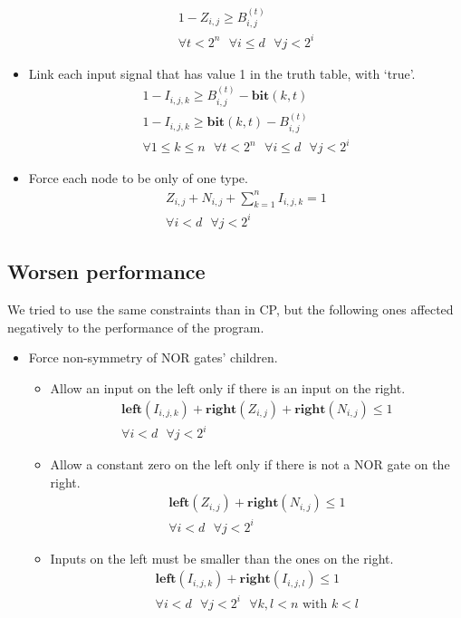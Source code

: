 \documentclass[letterpaper,10pt]{article}
\begin{document}
\begin{itemize}
\begin{align*}
        1 - Z_{i,j} \geq B_{i,j}^{(t)} \\
        \forall t < 2^n\text{ }\forall i \leq d\text{ }\forall j < 2^i
    \end{align*}
    \item Link each input signal that has value 1 in the truth table, with `true'.
    \begin{align*}
        1 - I_{i,j,k} \geq B_{i,j}^{(t)} - \mathbf{bit}(k,t) \\
        1 - I_{i,j,k} \geq \mathbf{bit}(k,t) - B_{i,j}^{(t)} \\
        \forall 1 \leq k \leq n\text{ }\forall t  < 2^n\text{ }\forall i \leq d\text{ }\forall j < 2^i
    \end{align*}
    \item Force each node to be only of one type.
    \begin{align*}
        Z_{i,j} + N_{i,j} + \sum_{k = 1}^n {I_{i,j,k}} = 1\\
        \forall i < d\text{ }\forall j < 2^i
    \end{align*}
\end{itemize}

\subsection{Worsen performance}
We tried to use the same constraints than in CP, but the following ones affected negatively to the performance of the program.
\begin{itemize}
\item Force non-symmetry of NOR gates' children.
\begin{itemize}
    \item Allow an input on the left only if there is an input on the right.
        \begin{align*}
            \mathbf{left}(I_{i,j,k}) + \mathbf{right}(Z_{i,j}) + \mathbf{right}(N_{i,j}) \leq 1 \\
            \forall i < d\text{ }\forall j < 2^i
        \end{align*}
    \item Allow a constant zero on the left only if there is not a NOR gate on the right.
        \begin{align*}
            \mathbf{left}(Z_{i,j}) + \mathbf{right}(N_{i,j}) \leq 1  \\
            \forall i < d\text{ }\forall j < 2^i
        \end{align*}
    \item Inputs on the left must be smaller than the ones on the right.
        \begin{align*}
            \mathbf{left}(I_{i,j,k}) + \mathbf{right}(I_{i,j,l}) \leq 1 \\
            \forall i < d\text{ }\forall j < 2^i\text{ }\forall k,l < n\text{ with }k < l
        \end{align*}
\end{itemize}
\end{itemize}
\end{document}
